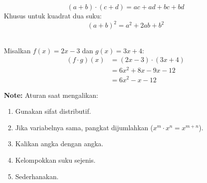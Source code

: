 \begin{definition}
  \[ (a + b) \cdot (c + d) = ac + ad + bc + bd \]
  Khusus untuk kuadrat dua suku:
  \[ (a + b)^2 = a^2 + 2ab + b^2 \]
\end{definition}

\begin{example}
  \hfill \\
  Misalkan $f(x) = 2x - 3$ dan $g(x) = 3x + 4$:
  \[
  \begin{aligned}
    (f \cdot g)(x) &= (2x - 3) \cdot (3x + 4) \\
    &= 6x^2 + 8x - 9x - 12 \\
    &= 6x^2 - x - 12
  \end{aligned}
  \]
\end{example}

\textbf{Note:} Aturan saat mengalikan:
\begin{enumerate}
\item Gunakan sifat distributif.
\item Jika variabelnya sama, pangkat dijumlahkan ($x^m \cdot x^n = x^{m + n}$).
\item Kalikan angka dengan angka.
\item Kelompokkan suku sejenis.
\item Sederhanakan.
\end{enumerate}
